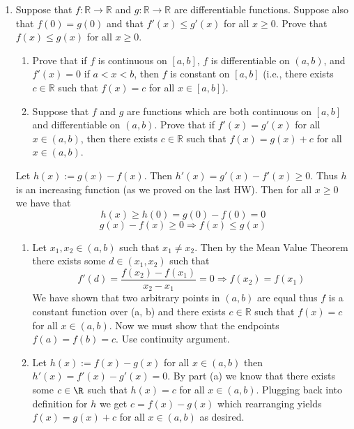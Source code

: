 \documentclass[11pt]{exam}
\begin{document}
    \begin{enumerate}
        \item Suppose that \( f : \mathbb{R} \to \mathbb{R} \) and \( g : \mathbb{R} 
        \to \mathbb{R} \) are differentiable functions. Suppose also that \( f(0) = g
        (0) \) and that \( f'(x) \leq g'(x) \) for all \( x \geq 0 \). Prove that \( f(x) \leq g
        (x) \) for all \( x \geq 0 \).
            \begin{enumerate}
                \item Prove that if \( f \) is continuous on \( [a, b] \), \( f \) is 
                differentiable on \( (a, b) \), and \( f'(x) = 0 \) if \( a < x < b \), then \( 
                    f \) is constant on \( [a, b] \) (i.e., there exists \( c \in \mathbb{R} \) 
                    such that \( f(x) = c \) for all \( x \in [a, b] \)).
                \item Suppose that \( f \) and \( g \) are functions which are both continuous 
                on \( [a, b] \) and differentiable on \( (a, b) \). Prove that if \( f'(x) = g'
                (x) \) for all \( x \in (a, b) \), then there exists \( c \in \mathbb{R} \) 
                such that \( f(x) = g(x) + c \) for all \( x \in (a, b) \).
            \end{enumerate}
                \begin{solution}
                    Let $h(x) := g(x) - f(x)$. Then $h'(x) = g'(x) - f'(x) \geq 0$. Thus $h$ 
                    is an increasing function (as we proved on the last HW). Then for all $x \geq 0$ we have that 
                    $$h(x) \geq h(0) = g(0) - f(0) = 0$$
                    $$g(x) - f(x) \geq 0 \Longrightarrow f(x) \leq g(x)$$ 
                    \begin{enumerate}
                        \item Let $x_1, x_2 \in (a,b)$ such that $x_1 \neq x_2$. Then by the Mean Value Theorem there exists some $d \in (x_1, x_2)$ such that 
                        $$f'(d) = \frac{f(x_2) - f(x_1)}{x_2 - x_1} = 0 \Longrightarrow f(x_2) = f(x_1)$$
                        We have shown that two arbitrary points in $(a,b)$ are equal thus $f$
                        is a constant function over (a, b) and there exists \( c \in \mathbb{R} \) 
                        such that \( f(x) = c \) for all \( x \in (a, b) \). Now we must show that the endpoints $f(a) = f(b) = c$. Use continuity argument.
                        \item Let $h(x) := f(x) - g(x)$ for all $x \in (a, b)$ then $h'(x) = f'(x) - g'(x) = 0$. By part (a) we know that there exists some $c \in \R$ such that $h(x) = c$ for all $x \in (a, b)$. Plugging back into definition for $h$ we get $c = f(x) - g(x)$ which rearranging yields $f(x) = g(x) + c$ for all $x \in (a, b)$ as desired.

\end{enumerate}
\end{solution}
\end{enumerate}
\end{document}
